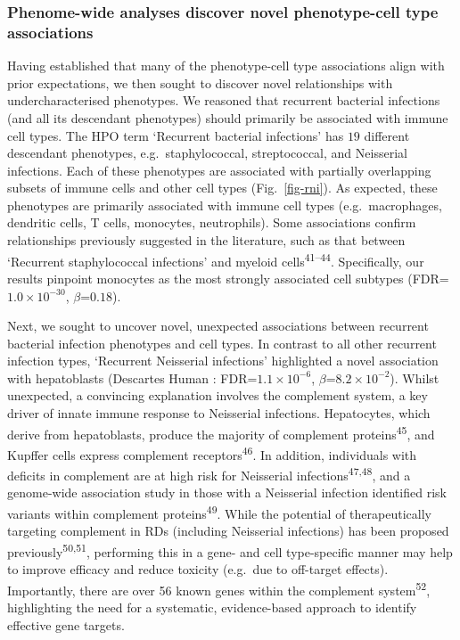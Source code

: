 \documentclass[
]{article}
\begin{document}
\subsubsection{Phenome-wide analyses discover novel phenotype-cell type
associations}\label{phenome-wide-analyses-discover-novel-phenotype-cell-type-associations}

Having established that many of the phenotype-cell type associations
align with prior expectations, we then sought to discover novel
relationships with undercharacterised phenotypes. We reasoned that
recurrent bacterial infections (and all its descendant phenotypes)
should primarily be associated with immune cell types. The HPO term
`Recurrent bacterial infections' has \(19\) different descendant
phenotypes, e.g.~staphylococcal, streptococcal, and Neisserial
infections. Each of these phenotypes are associated with partially
overlapping subsets of immune cells and other cell types
(Fig.~\ref{fig-rni}). As expected, these phenotypes are primarily
associated with immune cell types (e.g.~macrophages, dendritic cells, T
cells, monocytes, neutrophils). Some associations confirm relationships
previously suggested in the literature, such as that between `Recurrent
staphylococcal infections' and myeloid cells\textsuperscript{41--44}.
Specifically, our results pinpoint monocytes as the most strongly
associated cell subtypes (FDR=\(1.0 \times 10^{-30}\),
\(\beta\)=\(0.18\)).

Next, we sought to uncover novel, unexpected associations between
recurrent bacterial infection phenotypes and cell types. In contrast to
all other recurrent infection types, `Recurrent Neisserial infections'
highlighted a novel association with hepatoblasts (Descartes Human :
FDR=\(1.1 \times 10^{-6}\), \(\beta\)=\(8.2 \times 10^{-2}\)). Whilst
unexpected, a convincing explanation involves the complement system, a
key driver of innate immune response to Neisserial infections.
Hepatocytes, which derive from hepatoblasts, produce the majority of
complement proteins\textsuperscript{45}, and Kupffer cells express
complement receptors\textsuperscript{46}. In addition, individuals with
deficits in complement are at high risk for Neisserial
infections\textsuperscript{47,48}, and a genome-wide association study
in those with a Neisserial infection identified risk variants within
complement proteins\textsuperscript{49}. While the potential of
therapeutically targeting complement in RDs (including Neisserial
infections) has been proposed previously\textsuperscript{50,51},
performing this in a gene- and cell type-specific manner may help to
improve efficacy and reduce toxicity (e.g.~due to off-target effects).
Importantly, there are over 56 known genes within the complement
system\textsuperscript{52}, highlighting the need for a systematic,
evidence-based approach to identify effective gene targets.
\end{document}
